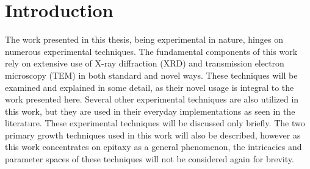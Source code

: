 \section{Introduction}
The work presented in this thesis, being experimental in nature, hinges on numerous experimental techniques.
The fundamental components of this work rely on extensive use of X-ray diffraction (XRD) and transmission electron microscopy (TEM) in both standard and novel ways.
These techniques will be examined and explained in some detail, as their novel usage is integral to the work presented here.
Several other experimental techniques are also utilized in this work, but they are used in their everyday implementations as seen in the literature.
These experimental techniques will be discussed only briefly.
The two primary growth techniques used in this work will also be described, however as this work concentrates on epitaxy as a general phenomenon, the intricacies and parameter spaces of these techniques will not be considered again for brevity.

